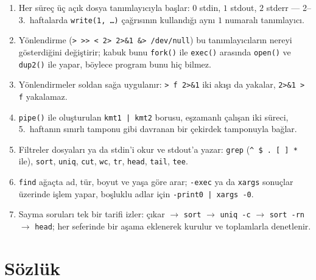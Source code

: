 \documentclass[11pt,a4paper]{article}
\newcommand{\cmd}[1]{\texttt{#1}}
\begin{document}
\begin{keyidea}
\begin{enumerate}[leftmargin=1.4em]
  \item Her süreç üç açık dosya tanımlayıcıyla başlar: $0$ stdin, $1$ stdout, $2$ stderr --- 2--3.~haftalarda \cmd{write(1, \dots)} çağrısının kullandığı aynı $1$ numaralı tanımlayıcı.
  \item Yönlendirme (\cmd{> >> < 2> 2>\&1 \&> /dev/null}) bu tanımlayıcıların nereyi gösterdiğini değiştirir; kabuk bunu \cmd{fork()} ile \cmd{exec()} arasında \cmd{open()} ve \cmd{dup2()} ile yapar, böylece program bunu hiç bilmez.
  \item Yönlendirmeler soldan sağa uygulanır: \cmd{> f 2>\&1} iki akışı da yakalar, \cmd{2>\&1 > f} yakalamaz.
  \item \cmd{pipe()} ile oluşturulan \cmd{kmt1 | kmt2} borusu, eşzamanlı çalışan iki süreci, 5.~haftanın sınırlı tamponu gibi davranan bir çekirdek tamponuyla bağlar.
  \item Filtreler dosyaları ya da stdin'i okur ve stdout'a yazar: \cmd{grep} (\texttt{\textasciicircum\ \$ . [ ] *} ile), \cmd{sort}, \cmd{uniq}, \cmd{cut}, \cmd{wc}, \cmd{tr}, \cmd{head}, \cmd{tail}, \cmd{tee}.
  \item \cmd{find} ağaçta ad, tür, boyut ve yaşa göre arar; \cmd{-exec} ya da \cmd{xargs} sonuçlar üzerinde işlem yapar, boşluklu adlar için \cmd{-print0 | xargs -0}.
  \item Sayma soruları tek bir tarifi izler: çıkar $\to$ \cmd{sort} $\to$ \cmd{uniq -c} $\to$ \cmd{sort -rn} $\to$ \cmd{head}; her seferinde bir aşama eklenerek kurulur ve toplamlarla denetlenir.
\end{enumerate}
\end{keyidea}

\section{Sözlük}
\end{document}

